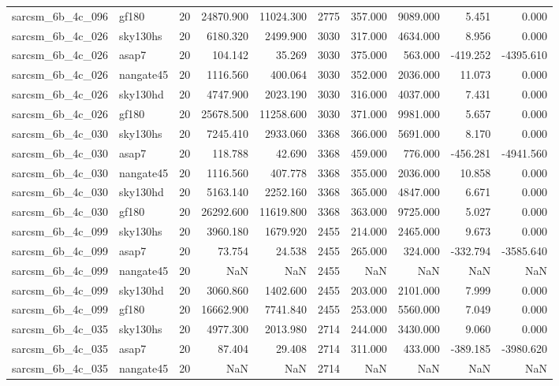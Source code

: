 \begin{tabular}{llrrrrrrrr}
sarcsm\_6b\_4c\_096 & gf180 & 20 & 24870.900 & 11024.300 & 2775 & 357.000 & 9089.000 & 5.451 & 0.000 \\
sarcsm\_6b\_4c\_026 & sky130hs & 20 & 6180.320 & 2499.900 & 3030 & 317.000 & 4634.000 & 8.956 & 0.000 \\
sarcsm\_6b\_4c\_026 & asap7 & 20 & 104.142 & 35.269 & 3030 & 375.000 & 563.000 & -419.252 & -4395.610 \\
sarcsm\_6b\_4c\_026 & nangate45 & 20 & 1116.560 & 400.064 & 3030 & 352.000 & 2036.000 & 11.073 & 0.000 \\
sarcsm\_6b\_4c\_026 & sky130hd & 20 & 4747.900 & 2023.190 & 3030 & 316.000 & 4037.000 & 7.431 & 0.000 \\
sarcsm\_6b\_4c\_026 & gf180 & 20 & 25678.500 & 11258.600 & 3030 & 371.000 & 9981.000 & 5.657 & 0.000 \\
sarcsm\_6b\_4c\_030 & sky130hs & 20 & 7245.410 & 2933.060 & 3368 & 366.000 & 5691.000 & 8.170 & 0.000 \\
sarcsm\_6b\_4c\_030 & asap7 & 20 & 118.788 & 42.690 & 3368 & 459.000 & 776.000 & -456.281 & -4941.560 \\
sarcsm\_6b\_4c\_030 & nangate45 & 20 & 1116.560 & 407.778 & 3368 & 355.000 & 2036.000 & 10.858 & 0.000 \\
sarcsm\_6b\_4c\_030 & sky130hd & 20 & 5163.140 & 2252.160 & 3368 & 365.000 & 4847.000 & 6.671 & 0.000 \\
sarcsm\_6b\_4c\_030 & gf180 & 20 & 26292.600 & 11619.800 & 3368 & 363.000 & 9725.000 & 5.027 & 0.000 \\
sarcsm\_6b\_4c\_099 & sky130hs & 20 & 3960.180 & 1679.920 & 2455 & 214.000 & 2465.000 & 9.673 & 0.000 \\
sarcsm\_6b\_4c\_099 & asap7 & 20 & 73.754 & 24.538 & 2455 & 265.000 & 324.000 & -332.794 & -3585.640 \\
sarcsm\_6b\_4c\_099 & nangate45 & 20 & NaN & NaN & 2455 & NaN & NaN & NaN & NaN \\
sarcsm\_6b\_4c\_099 & sky130hd & 20 & 3060.860 & 1402.600 & 2455 & 203.000 & 2101.000 & 7.999 & 0.000 \\
sarcsm\_6b\_4c\_099 & gf180 & 20 & 16662.900 & 7741.840 & 2455 & 253.000 & 5560.000 & 7.049 & 0.000 \\
sarcsm\_6b\_4c\_035 & sky130hs & 20 & 4977.300 & 2013.980 & 2714 & 244.000 & 3430.000 & 9.060 & 0.000 \\
sarcsm\_6b\_4c\_035 & asap7 & 20 & 87.404 & 29.408 & 2714 & 311.000 & 433.000 & -389.185 & -3980.620 \\
sarcsm\_6b\_4c\_035 & nangate45 & 20 & NaN & NaN & 2714 & NaN & NaN & NaN & NaN \\

\end{tabular}
